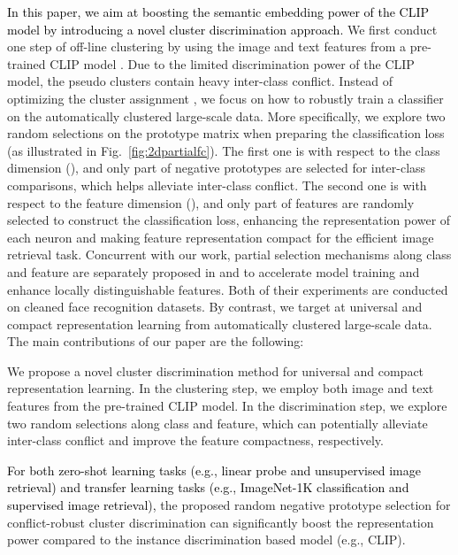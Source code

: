 \documentclass{article} \usepackage{iclr2023_conference,times}
\newenvironment{tight_itemize}{
\begin{itemize}[leftmargin=20pt]
  \setlength{\topsep}{0pt}
  \setlength{\itemsep}{0pt}
  \setlength{\parskip}{0pt}
  \setlength{\parsep}{0pt}
}{\end{itemize}}
\begin{document}
\textcolor{black}{In this paper, we aim at boosting the semantic embedding power of the CLIP model by introducing a novel cluster discrimination approach.}
We first conduct one step of off-line clustering by using the image and text features from a pre-trained CLIP model \citep{radford2021learning}. Due to the limited discrimination power of the CLIP model, the pseudo clusters contain heavy inter-class conflict. 
Instead of optimizing the cluster assignment \citep{qian2022unsupervised}, we focus on how to robustly train a classifier on the automatically clustered large-scale data. 
More specifically, we explore two random selections on the prototype matrix  when preparing the classification loss (as illustrated in Fig.~\ref{fig:2dpartialfc}). The first one is with respect to the class dimension (), and only part of negative prototypes are selected for inter-class comparisons, which helps alleviate inter-class conflict. 
The second one is with respect to the feature dimension (), and only part of features are randomly selected to construct the classification loss, enhancing the representation power of each neuron and making feature representation compact for the efficient image retrieval task. Concurrent with our work, partial selection mechanisms along class and feature are separately proposed in \citep{an2021partial,an2022killing} and \citep{xu2022subface} to accelerate model training and enhance locally distinguishable features. Both of their experiments are conducted on cleaned face recognition datasets. By contrast, we target at universal and compact representation learning from automatically clustered large-scale data. The main contributions of our paper are the following:
\vspace{-2mm}
\begin{tight_itemize}
\item We propose a novel cluster discrimination method for universal and compact representation learning. In the clustering step, we employ both image and text features from the pre-trained CLIP model. In the discrimination step, we explore two random selections along class and feature, which can potentially alleviate inter-class conflict and improve the feature compactness, respectively.
\item \textcolor{black}{For both zero-shot learning tasks (e.g., linear probe and unsupervised image retrieval) and transfer learning tasks (e.g., ImageNet-1K classification and supervised image retrieval),} the proposed random negative prototype selection for conflict-robust cluster discrimination can significantly boost the representation power compared to the instance discrimination based model (e.g., CLIP).
\end{tight_itemize}
\end{document}
